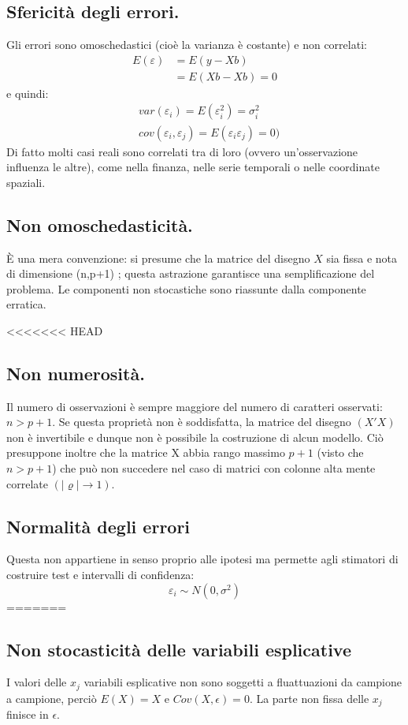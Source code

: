 \documentclass[11pt, twocolumn]{article}
\begin{document}
\subsection*{Sfericità degli errori.}
Gli errori sono omoschedastici (cioè la varianza è costante) e non correlati:
\begin{align*}
  E(\varepsilon) &= E(y - Xb) \\
              &= E(Xb - Xb) = 0
\end{align*}
e quindi:
\begin{align*}
  &var(\varepsilon_i) = E(\varepsilon_i^2) = \sigma_i^2 \\
  &cov(\varepsilon_i, \varepsilon_j) = E(\varepsilon_i\varepsilon_j) = 0)
\end{align*}
Di fatto molti casi reali sono correlati tra di loro (ovvero un'osservazione influenza le altre), come nella finanza, nelle serie temporali o nelle coordinate spaziali.

\subsection*{Non omoschedasticità.}
È una mera convenzione: si presume che la matrice del disegno $X$ sia fissa e nota di dimensione (n,p+1) ; questa astrazione garantisce una semplificazione del problema.
Le componenti non stocastiche sono riassunte dalla componente erratica.

<<<<<<< HEAD
\subsection*{Non numerosità.}
Il numero di osservazioni è sempre maggiore del numero di caratteri osservati: $n > p + 1$.
Se questa proprietà non è soddisfatta, la matrice del disegno $(X'X)$ non è invertibile e dunque non è possibile la costruzione di alcun modello. Ciò presuppone inoltre che la matrice X abbia rango massimo $p + 1$ (visto che $n > p + 1$) che può non succedere nel caso di matrici con colonne alta mente correlate $(|\varrho| \to 1)$.
\subsection*{Normalità degli errori}
Questa non appartiene in senso proprio alle ipotesi ma permette agli stimatori di costruire test e intervalli di confidenza:
$$\varepsilon_i \sim N(0,\sigma^2)$$
=======
\subsection*{Non stocasticità delle variabili esplicative}
I valori delle $x_j$ variabili esplicative non sono soggetti a fluattuazioni da campione a campione, perciò $E(X) = X$ e $Cov(X,\epsilon) = 0$. La parte non fissa delle $x_j$ finisce in $\epsilon$.
\end{document}
